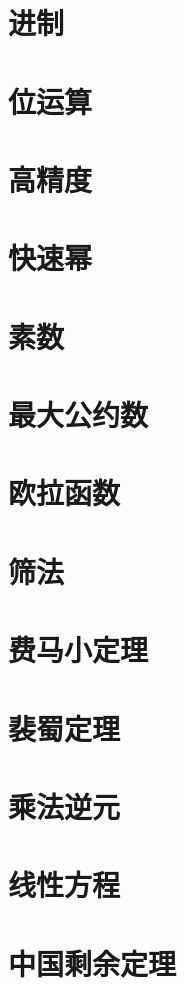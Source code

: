 \section{进制}

\section{位运算}

\section{高精度}

\section{快速幂}

  \section{素数}
  
  \section{最大公约数}
  
  \section{欧拉函数}
  
  \section{筛法}
  
  \section{费马小定理}
  
  \section{裴蜀定理}
  
  \section{乘法逆元}
  
  \section{线性方程}
  
  \section{中国剩余定理}
  
